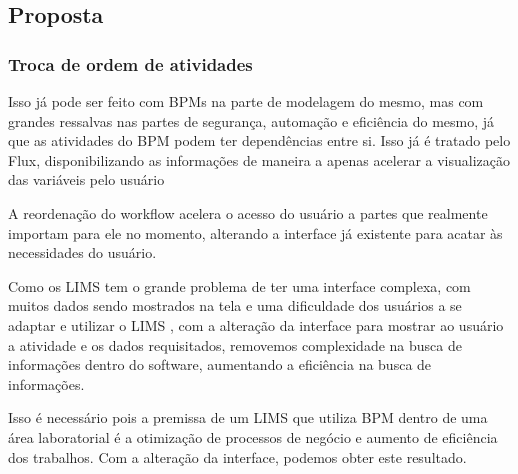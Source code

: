 \subsection{Proposta}

\subsubsection{Troca de ordem de atividades}




Isso já pode ser feito com BPMs na parte de modelagem do mesmo, mas com grandes ressalvas nas partes de segurança, automação e eficiência do mesmo, já que as atividades do BPM podem ter dependências entre si. Isso já é tratado pelo Flux, disponibilizando as informações de maneira a apenas acelerar a visualização das variáveis pelo usuário


A reordenação do workflow acelera o acesso do usuário a partes que realmente importam para ele no momento, alterando a interface já existente para acatar às necessidades do usuário.


Como os LIMS tem o grande problema de ter uma interface complexa, com muitos dados sendo mostrados na tela e uma dificuldade dos usuários a se adaptar e utilizar o LIMS \R, com a alteração da interface para mostrar ao usuário a atividade e os dados requisitados, removemos complexidade na busca de informações dentro do software, aumentando a eficiência na busca de informações.


Isso é necessário pois a premissa de um LIMS que utiliza BPM dentro de uma área laboratorial é a otimização de processos de negócio e aumento de eficiência dos trabalhos. Com a alteração da interface, podemos obter este resultado.
